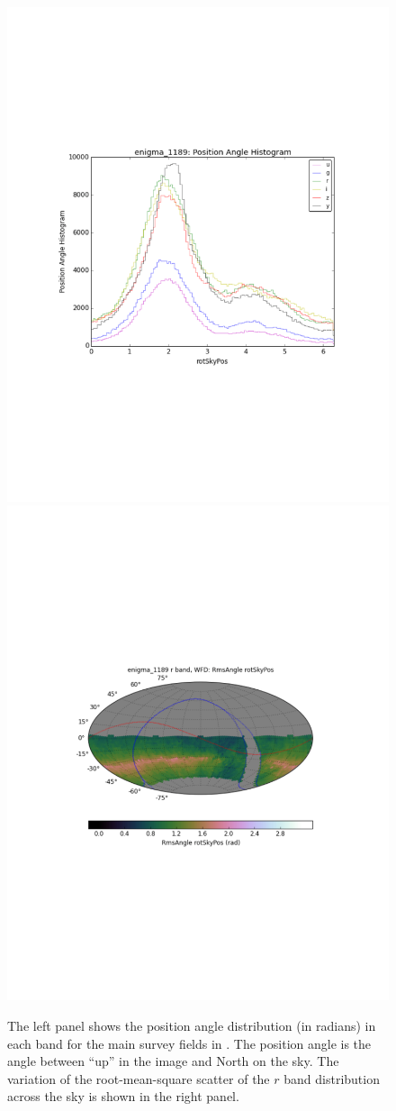 \begin{figure}[b!]
\vskip -1.1in
\includegraphics[angle=0,width=0.49\hsize:,clip]{figs/enigma1189_rotator.pdf}
\includegraphics[angle=0,width=0.49\hsize:,clip]{figs/enigma1189_rotator2.pdf}
\vskip -1.3in
\caption{The left panel shows the position angle distribution (in radians)  in each band for the
main survey fields in . The position angle is the angle between ``up'' in the image
and North on the sky. The variation of the root-mean-square scatter of the $r$ band
distribution across the sky is shown in the right panel.}
\label{fig:rotator}
\end{figure}

